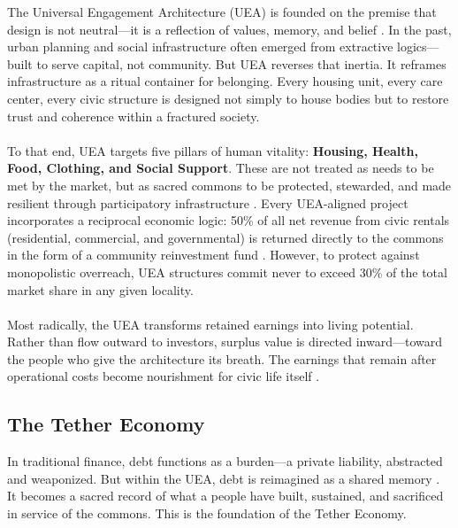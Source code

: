 \documentclass[12pt]{article}
\begin{document}
The Universal Engagement Architecture (UEA) is founded on the premise that design is not neutral—it is a reflection of values, memory, and belief \cite{scott1998seeing}. In the past, urban planning and social infrastructure often emerged from extractive logics—built to serve capital, not community. But UEA reverses that inertia. It reframes infrastructure as a ritual container for belonging. Every housing unit, every care center, every civic structure is designed not simply to house bodies but to restore trust and coherence within a fractured society.

\paragraph{}To that end, UEA targets five pillars of human vitality: \textbf{Housing, Health, Food, Clothing, and Social Support}. These are not treated as needs to be met by the market, but as sacred commons to be protected, stewarded, and made resilient through participatory infrastructure \cite{sen1999development}. Every UEA-aligned project incorporates a reciprocal economic logic: 50\% of all net revenue from civic rentals (residential, commercial, and governmental) is returned directly to the commons in the form of a community reinvestment fund \cite{kelly2012new}. However, to protect against monopolistic overreach, UEA structures commit never to exceed 30\% of the total market share in any given locality.

\paragraph{}Most radically, the UEA transforms retained earnings into living potential. Rather than flow outward to investors, surplus value is directed inward—toward the people who give the architecture its breath. The earnings that remain after operational costs become nourishment for civic life itself \cite{brown2022civic}.

\subsection{The Tether Economy}

In traditional finance, debt functions as a burden—a private liability, abstracted and weaponized. But within the UEA, debt is reimagined as a shared memory \cite{graeber2011debt}. It becomes a sacred record of what a people have built, sustained, and sacrificed in service of the commons. This is the foundation of the Tether Economy.
\end{document}
